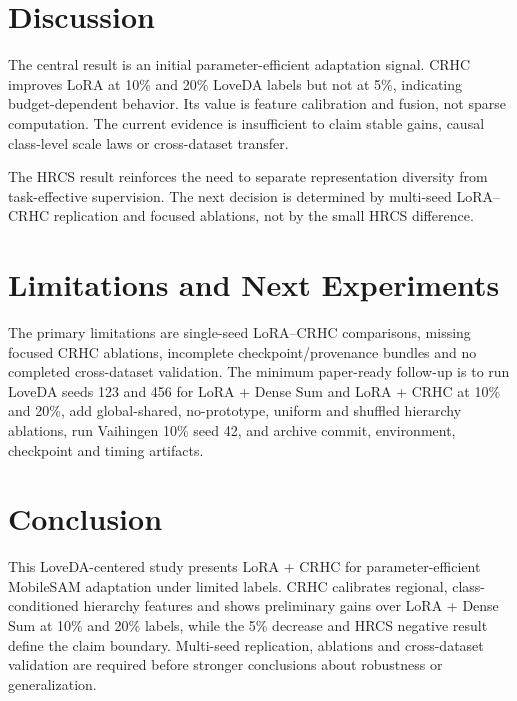 \documentclass[10pt,twocolumn]{article}
\begin{document}
\section{Discussion}
The central result is an initial parameter-efficient adaptation signal. CRHC improves LoRA at 10\% and 20\% LoveDA labels but not at 5\%, indicating budget-dependent behavior. Its value is feature calibration and fusion, not sparse computation. The current evidence is insufficient to claim stable gains, causal class-level scale laws or cross-dataset transfer.

The HRCS result reinforces the need to separate representation diversity from task-effective supervision. The next decision is determined by multi-seed LoRA--CRHC replication and focused ablations, not by the small HRCS difference.

\section{Limitations and Next Experiments}
The primary limitations are single-seed LoRA--CRHC comparisons, missing focused CRHC ablations, incomplete checkpoint/provenance bundles and no completed cross-dataset validation. The minimum paper-ready follow-up is to run LoveDA seeds 123 and 456 for LoRA + Dense Sum and LoRA + CRHC at 10\% and 20\%, add global-shared, no-prototype, uniform and shuffled hierarchy ablations, run Vaihingen 10\% seed 42, and archive commit, environment, checkpoint and timing artifacts.

\section{Conclusion}
This LoveDA-centered study presents LoRA + CRHC for parameter-efficient MobileSAM adaptation under limited labels. CRHC calibrates regional, class-conditioned hierarchy features and shows preliminary gains over LoRA + Dense Sum at 10\% and 20\% labels, while the 5\% decrease and HRCS negative result define the claim boundary. Multi-seed replication, ablations and cross-dataset validation are required before stronger conclusions about robustness or generalization.



\end{document}
